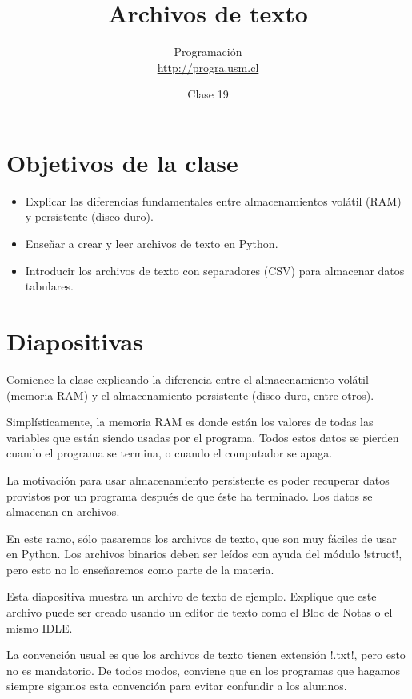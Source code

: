 \documentclass[10pt]{article}
\title{Archivos de texto}
\author{Programación \\ \url{http://progra.usm.cl}}
\date{Clase 19}
\begin{document}
  \maketitle

  \section*{Objetivos de la clase}
  \begin{itemize}
    \item Explicar las diferencias fundamentales
      entre almacenamientos volátil (RAM) y persistente (disco duro).
    \item Enseñar a crear y leer archivos de texto en Python.
    \item Introducir los archivos de texto con separadores (CSV)
      para almacenar datos tabulares.
  \end{itemize}

  \section*{Diapositivas}

  Comience la clase explicando la diferencia entre el almacenamiento volátil
  (memoria RAM) y el almacenamiento persistente (disco duro, entre otros).

  Simplísticamente, la memoria RAM es donde están los valores de todas las variables
  que están siendo usadas por el programa.
  Todos estos datos se pierden cuando el programa se termina,
  o cuando el computador se apaga.

  La motivación para usar almacenamiento persistente
  es poder recuperar datos provistos por un programa
  después de que éste ha terminado.
  Los datos se almacenan en archivos.

  En este ramo,
  sólo pasaremos los archivos de texto,
  que son muy fáciles de usar en Python.
  Los archivos binarios deben ser leídos con ayuda del módulo \li!struct!,
  pero esto no lo enseñaremos como parte de la materia.


  Esta diapositiva muestra un archivo de texto de ejemplo.
  Explique que este archivo puede ser creado
  usando un editor de texto como el Bloc de Notas
  o el mismo IDLE.

  La convención usual es que los archivos de texto tienen extensión \li!.txt!,
  pero esto no es mandatorio.
  De todos modos, conviene que en los programas que hagamos
  siempre sigamos esta convención
  para evitar confundir a los alumnos.
\end{document}
